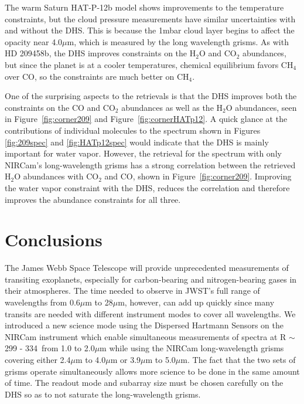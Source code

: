 \documentclass[iop]{emulateapj}
\newcommand{\DHSres}{299 - 334}
\begin{document}
The warm Saturn HAT-P-12b model shows improvements to the temperature constraints, but the cloud pressure measurements have similar uncertainties with and without the DHS.
This is because the 1mbar cloud layer begins to affect the opacity near 4.0$\mu$m, which is measured by the long wavelength grisms.
As with HD 209458b, the DHS improves constraints on the H$_2$O and CO$_2$ abundances, but since the planet is at a cooler temperatures, chemical equilibrium favors CH$_4$ over CO, so the constraints are much better on CH$_4$.


One of the surprising aspects to the retrievals is that the DHS improves both the constraints on the CO and CO$_2$ abundances as well as the H$_2$O abundances, seen in Figure~\ref{fig:corner209} and Figure~\ref{fig:cornerHATp12}. 
A quick glance at the contributions of individual molecules to the spectrum shown in Figures \ref{fig:209spec} and \ref{fig:HATp12spec} would indicate that the DHS is mainly important for water vapor.
However, the retrieval for the spectrum with only NIRCam's long-wavelength grisms has a strong correlation between the retrieved H$_2$O abundances with CO$_2$ and CO, shown in Figure~\ref{fig:corner209}.
Improving the water vapor constraint with the DHS, reduces the correlation and therefore improves the abundance constraints for all three.






\section{Conclusions}

The James Webb Space Telescope will provide unprecedented measurements of transiting exoplanets, especially for carbon-bearing and nitrogen-bearing gases in their atmospheres.
The time needed to observe in JWST's full range of wavelengths from 0.6$\mu$m to 28$\mu$m, however, can add up quickly since many transits are needed with different instrument modes to cover all wavelengths.
We introduced a new science mode using the Dispersed Hartmann Sensors on the NIRCam instrument which enable simultaneous measurements of spectra at R $\sim$ \DHSres\ from 1.0 to 2.0$\mu$m while using the NIRCam long-wavelength grisms covering either 2.4$\mu$m to 4.0$\mu$m or 3.9$\mu$m to 5.0$\mu$m.
The fact that the two sets of grisms operate simultaneously allows more science to be done in the same amount of time.
The readout mode and subarray size must be chosen carefully on the DHS so as to not saturate the long-wavelength grisms.
\end{document}

